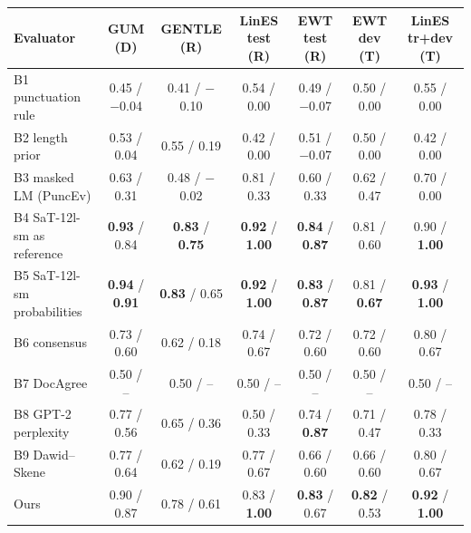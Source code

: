 \begin{tabular}{lcccccc}
\toprule
Evaluator & GUM (D) & GENTLE (R) & LinES test (R) & EWT test (R) & EWT dev (T) & LinES tr+dev (T) \\
\midrule
B1 punctuation rule & 0.45 / $-$0.04 & 0.41 / $-$0.10 & 0.54 / 0.00 & 0.49 / $-$0.07 & 0.50 / 0.00 & 0.55 / 0.00 \\
B2 length prior & 0.53 / 0.04 & 0.55 / 0.19 & 0.42 / 0.00 & 0.51 / $-$0.07 & 0.50 / 0.00 & 0.42 / 0.00 \\
B3 masked LM (PuncEv) & 0.63 / 0.31 & 0.48 / $-$0.02 & 0.81 / 0.33 & 0.60 / 0.33 & 0.62 / 0.47 & 0.70 / 0.00 \\
B4 SaT-12l-sm as reference & \textbf{0.93} / 0.84 & \textbf{0.83} / \textbf{0.75} & \textbf{0.92} / \textbf{1.00} & \textbf{0.84} / \textbf{0.87} & 0.81 / 0.60 & 0.90 / \textbf{1.00} \\
B5 SaT-12l-sm probabilities & \textbf{0.94} / \textbf{0.91} & \textbf{0.83} / 0.65 & \textbf{0.92} / \textbf{1.00} & \textbf{0.83} / \textbf{0.87} & 0.81 / \textbf{0.67} & \textbf{0.93} / \textbf{1.00} \\
B6 consensus & 0.73 / 0.60 & 0.62 / 0.18 & 0.74 / 0.67 & 0.72 / 0.60 & 0.72 / 0.60 & 0.80 / 0.67 \\
B7 DocAgree & 0.50 / -- & 0.50 / -- & 0.50 / -- & 0.50 / -- & 0.50 / -- & 0.50 / -- \\
B8 GPT-2 perplexity & 0.77 / 0.56 & 0.65 / 0.36 & 0.50 / 0.33 & 0.74 / \textbf{0.87} & 0.71 / 0.47 & 0.78 / 0.33 \\
B9 Dawid--Skene & 0.77 / 0.64 & 0.62 / 0.19 & 0.77 / 0.67 & 0.66 / 0.60 & 0.66 / 0.60 & 0.80 / 0.67 \\
Ours & 0.90 / 0.87 & 0.78 / 0.61 & 0.83 / \textbf{1.00} & \textbf{0.83} / 0.67 & \textbf{0.82} / 0.53 & \textbf{0.92} / \textbf{1.00} \\
\bottomrule
\end{tabular}
